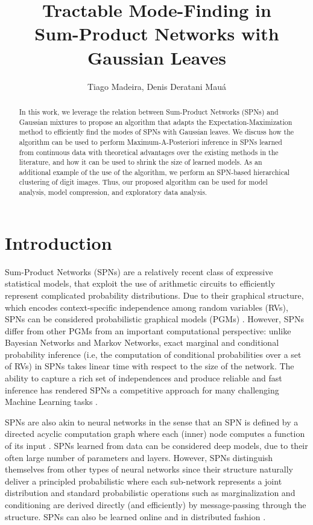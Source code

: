 \documentclass[12pt]{article}
\title{Tractable Mode-Finding in\\Sum-Product Networks with Gaussian Leaves}
\author{Tiago Madeira\inst{1}, Denis Deratani Mauá\inst{1}}
\begin{document}
 

\maketitle

\begin{abstract}
In this work, we leverage the relation between Sum-Product Networks (SPNs) and Gaussian mixtures to propose an algorithm that adapts the Expectation-Maximization method to efficiently find the modes of SPNs with Gaussian leaves.
We discuss how the algorithm can be used to perform Maximum-A-Posteriori inference in SPNs learned from continuous data with theoretical advantages over the existing methods in the literature, and how it can be used to shrink the size of learned models.
As an additional example of the use of the algorithm, we perform an SPN-based hierarchical clustering of digit images.
Thus, our proposed algorithm can be used for model analysis, model compression, and exploratory data analysis.
\end{abstract}

\section{Introduction}
\label{sec:introduction}

Sum-Product Networks (SPNs) are a relatively recent class of expressive statistical models, that exploit the use of arithmetic circuits \cite{Darwiche2003, Rooshenas2014} to efficiently represent complicated probability distributions.
Due to their graphical structure, which encodes context-specific independence among random variables (RVs), SPNs can be considered probabilistic graphical models (PGMs) \cite{Koller2009}. However, SPNs differ from other PGMs from an important computational perspective: unlike Bayesian Networks and Markov Networks, exact marginal and conditional probability inference (i.e, the computation of conditional probabilities over a set of RVs) in SPNs takes linear time with respect to the size of the network.
The ability to capture a rich set of independences and produce reliable and fast inference has rendered SPNs a competitive approach for many challenging Machine Learning tasks \cite{Poon2011,julissa-bracis,Peharz2014,Cheng2014,Amer2016}.

SPNs are also akin to neural networks in the sense that an SPN is defined by a directed acyclic computation graph where each (inner) node computes a function of its input \cite{Hsu2017}.
SPNs learned from data can be considered deep models, due to their often large number of parameters and layers. 
However, SPNs distinguish themselves from other types of neural networks since their structure naturally deliver a principled probabilistic where each sub-network represents a joint distribution and standard probabilistic operations such as marginalization and conditioning are derived directly (and efficiently) by message-passing through the structure.
SPNs can also be learned online \cite{Lee2013, Jaini2016} and in distributed fashion \cite{Rashwan2016}.
\end{document}
